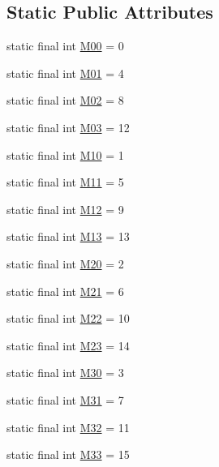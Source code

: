 \subsection*{Static Public Attributes}
\begin{DoxyCompactItemize}
\item 
static final int \hyperlink{classairhockeyjava_1_1util_1_1_matrix4_a66aa09dd1f4eeec707922eafd3e6fd7c}{M00} = 0
\item 
static final int \hyperlink{classairhockeyjava_1_1util_1_1_matrix4_a79d141c5badf62e62eb5b9b9ec0bab47}{M01} = 4
\item 
static final int \hyperlink{classairhockeyjava_1_1util_1_1_matrix4_a966bb97b392769730cde5c5415549bc2}{M02} = 8
\item 
static final int \hyperlink{classairhockeyjava_1_1util_1_1_matrix4_a0da4a8966b37ffa3f11a1a7a7c52feea}{M03} = 12
\item 
static final int \hyperlink{classairhockeyjava_1_1util_1_1_matrix4_a68186877c2b74764b003a59eee8211be}{M10} = 1
\item 
static final int \hyperlink{classairhockeyjava_1_1util_1_1_matrix4_a63bab06f0c9bf49908c435800cd352c0}{M11} = 5
\item 
static final int \hyperlink{classairhockeyjava_1_1util_1_1_matrix4_a9b1b021afa2c59e3fc33c40640407d3c}{M12} = 9
\item 
static final int \hyperlink{classairhockeyjava_1_1util_1_1_matrix4_a53bb7a464da8feab986b2e1a97bb62e1}{M13} = 13
\item 
static final int \hyperlink{classairhockeyjava_1_1util_1_1_matrix4_a1676daab371b7497cda50daed0cc8b3f}{M20} = 2
\item 
static final int \hyperlink{classairhockeyjava_1_1util_1_1_matrix4_a238f57ac1896ecb261e4d6ad0ef70c08}{M21} = 6
\item 
static final int \hyperlink{classairhockeyjava_1_1util_1_1_matrix4_a4702850982b76363406d25f53a6fd292}{M22} = 10
\item 
static final int \hyperlink{classairhockeyjava_1_1util_1_1_matrix4_a0595b8bcc8a9b6efcdd76707983aa931}{M23} = 14
\item 
static final int \hyperlink{classairhockeyjava_1_1util_1_1_matrix4_ad2d49245936af678e5fba9da47a18159}{M30} = 3
\item 
static final int \hyperlink{classairhockeyjava_1_1util_1_1_matrix4_a2c4e47d24066bfa9a9a63879a8762862}{M31} = 7
\item 
static final int \hyperlink{classairhockeyjava_1_1util_1_1_matrix4_af4ce88667776c574ee98ffb83c80ed8c}{M32} = 11
\item 
static final int \hyperlink{classairhockeyjava_1_1util_1_1_matrix4_ab6e1e407ef893069c4a3654233390772}{M33} = 15
\end{DoxyCompactItemize}


